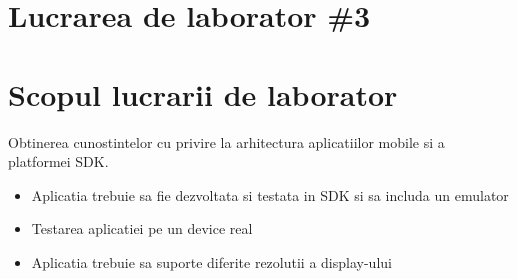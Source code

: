 \section*{Lucrarea de laborator \#3}

\section{Scopul lucrarii de laborator}
Obtinerea cunostintelor cu privire la arhitectura aplicatiilor mobile si a platformei SDK.

\begin{itemize}
	\item Aplicatia trebuie sa fie dezvoltata si testata in SDK si sa includa un emulator
	\item Testarea aplicatiei pe un device real
	\item Aplicatia trebuie sa suporte diferite rezolutii a display-ului
\end{itemize}

\clearpage